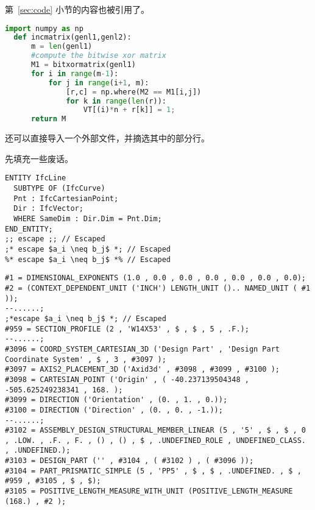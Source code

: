 \documentclass[../Main/thesis]{subfiles}
\begin{document}
第~\ref{sec:code} 小节的内容也被引用了。

\begin{lstlisting}[language=Python,
  caption=中文标题没有括号,
  label=lst:outer,
  style=colorEX]
  import numpy as np
  def incmatrix(genl1,genl2):
      m = len(genl1)
      #compute the bitwise xor matrix
      M1 = bitxormatrix(genl1)
      for i in range(m-1):
          for j in range(i+1, m):
              [r,c] = np.where(M2 == M1[i,j])
              for k in range(len(r)):
                  VT[(i)*n + r[k]] = 1;
      return M
\end{lstlisting}

还可以直接导入一个外部文件，并摘选其中的部分行。



先填充一些废话。\zhlipsum[12]

\begin{lstlisting}[language=EXPRESS,
  caption=IfcLine的EXPRESS定义,
  label=lst:ifcline-express,
  style=colorEX]
ENTITY IfcLine
  SUBTYPE OF (IfcCurve)
  Pnt : IfcCartesianPoint;
  Dir : IfcVector;
  WHERE SameDim : Dir.Dim = Pnt.Dim;
END_ENTITY;
;; escape ;; // Escaped
;* escape $a_i \neq b_j$ *; // Escaped
%* escape $a_i \neq b_j$ *% // Escaped
\end{lstlisting}

\begin{lstlisting}[language=EXPRESS,
  caption=CIS/2中的梁,
  label=lst:cis2beam,
  style=colorEX]
#1 = DIMENSIONAL_EXPONENTS (1.0 , 0.0 , 0.0 , 0.0 , 0.0 , 0.0 , 0.0);
#2 = (CONTEXT_DEPENDENT_UNIT ('INCH') LENGTH_UNIT ().. NAMED_UNIT ( #1 ));
--......;
;*escape $a_i \neq b_j$ *; // Escaped
#959 = SECTION_PROFILE (2 , 'W14X53' , $ , $ , 5 , .F.);
--......;
#3096 = COORD_SYSTEM_CARTESIAN_3D ('Design Part' , 'Design Part Coordinate System' , $ , 3 , #3097 );
#3097 = AXIS2_PLACEMENT_3D ('Axid3d' , #3098 , #3099 , #3100 );
#3098 = CARTESIAN_POINT ('Origin' , ( -40.237139504348 , -505.625249238341 , 168. );
#3099 = DIRECTION ('Orientation' , (0. , 1. , 0.));
#3100 = DIRECTION ('Direction' , (0. , 0. , -1.));
--......;
#3102 = ASSEMBLY_DESIGN_STRUCTURAL_MEMBER_LINEAR (5 , '5' , $ , $ , 0 , .LOW. , .F. , F. , () , () , $ , .UNDEFINED_ROLE , UNDEFINED_CLASS. , .UNDEFINED.);
#3103 = DESIGN_PART ('' , #3104 , ( #3102 ) , ( #3096 ));
#3104 = PART_PRISMATIC_SIMPLE (5 , 'PP5' , $ , $ , .UNDEFINED. , $ , #959 , #3105 , $ , $);
#3105 = POSITIVE_LENGTH_MEASURE_WITH_UNIT (POSITIVE_LENGTH_MEASURE (168.) , #2 );
\end{lstlisting}
\end{document}
